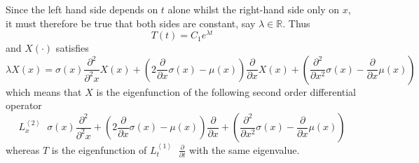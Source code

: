 \documentclass[a4paper]{article}
\newcommand{\brac}[1]{{\left ( #1 \right )}}
\newcommand{\brkt}[1]{{\left\langle #1 \right\rangle}}
\newcommand{\Real}{\mathbb{R}}
\newcommand{\defn}{\mathop{\overset{\Delta}{=}}\nolimits}
\begin{document}
Since the left hand side depends on $t$ alone whilst the right-hand side only on $x$,
it must therefore be true that both sides are constant, say $\lambda\in \Real$. Thus
\[ T(t) = C_1 e^{\lambda t} \] and $X(\cdot)$ satisfies
\[\lambda X(x) = \sigma(x) \frac{\partial^2}{\partial^2 x} X(x) + \brac{ 2 \frac{\partial}{\partial x} \sigma(x) - \mu(x) } \frac{\partial}{\partial x} X(x) + \brac{ \frac{\partial^2}{\partial x^2} \sigma(x) - \frac{\partial}{\partial x} \mu(x) }\]
which means that $X$ is the eigenfunction of the following second order differential operator
\[L^\brkt{2}_x \defn \sigma(x) \frac{\partial^2}{\partial^2 x} + \brac{ 2 \frac{\partial}{\partial x} \sigma(x) - \mu(x) } \frac{\partial}{\partial x} + \brac{ \frac{\partial^2}{\partial x^2} \sigma(x) - \frac{\partial}{\partial x} \mu(x) } \]
whereas $T$ is the eigenfunction of $L^\brkt{1}_t \defn \frac{\partial}{\partial t}$ with the same eigenvalue.
\end{document}
